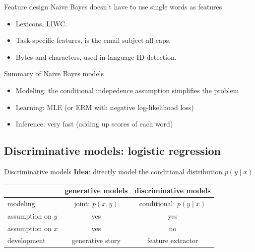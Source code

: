 \documentclass[usenames,dvipsnames,notes,11pt,aspectratio=169]{beamer}
\newcommand{\pdfnote}[1]{}
\begin{document}
\begin{frame}
    {Feature design}
        Naive Bayes doesn't have to use single words as features
    \begin{itemize}
        \itemsep1em
        \item Lexicons, \eg LIWC.
        \item Task-specific features, \eg is the email subject all caps.
        \item Bytes and characters, \eg used in language ID detection.
    \end{itemize}
    \pdfnote{
        Char/byte NB model is a very fast and effective language ID detector (e.g., google translate).
    }
\end{frame}

\begin{frame}
    {Summary of Naive Bayes models}
    \begin{itemize}
        \item Modeling: the conditional indepedence assumption simplifies the problem
        \item Learning: MLE (or ERM with negative log-likelihood loss)
        \item Inference: very fast (adding up scores of each word)
    \end{itemize}
\end{frame}

\subsection{Discriminative models: logistic regression}

\begin{frame}
    {Discriminative models}
    \textbf{Idea}: directly model the conditional distribution $p(y\mid x)$
    \pause
    \begin{table}
        \renewcommand{\arraystretch}{1.5}
        \begin{tabular}{lcc}
            & generative models & discriminative models \\
            \hline
            modeling & joint: $p(x,y)$ & conditional: $p(y\mid x)$ \\
            assumption on $y$ & yes & yes \\
            assumption on $x$ & yes & no \\
            development & generative story & feature extractor
        \end{tabular}
    \end{table}
    \pdfnote{
        In Naive Bayes model, we used Bayes rule to get $p(y\mid x)$ given $p(x\mid y)$ and the class prior $p(y)$.
        But one question here is, if $p(y\mid x)$ is what we are ultimately interested in, why bother modeling the data likelihood and the prior as opposed to directly modeling $p(y\mid x)$.
    }
\end{frame}
\end{document}
